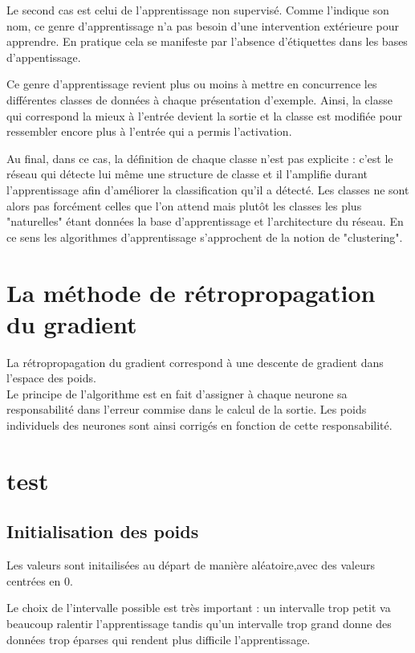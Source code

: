 \documentclass[a4paper,twoside]{report}
\begin{document}
                Le second cas est celui de l'apprentissage non supervisé. Comme l'indique son nom, ce genre d'apprentissage n'a pas besoin d'une intervention extérieure pour apprendre. En pratique cela se manifeste par l'absence d'étiquettes dans les bases d'appentissage.

                Ce genre d'apprentissage revient plus ou moins à mettre en concurrence les différentes classes de données à chaque présentation d'exemple. Ainsi, la classe qui correspond la mieux à l'entrée devient la sortie et la classe est modifiée pour ressembler encore plus à l'entrée qui a permis l'activation.

                Au final, dans ce cas, la définition de chaque classe n'est pas explicite : c'est le réseau qui détecte lui même une structure de classe et il l'amplifie durant l'apprentissage afin d'améliorer la classification qu'il a détecté. Les classes ne sont alors pas forcément celles que l'on attend mais plutôt les classes les plus "naturelles" étant données la base d'apprentissage et l'architecture du réseau. En ce sens les algorithmes d'apprentissage s'approchent de la notion de "clustering".


            \section{La méthode de rétropropagation du gradient}

                La rétropropagation du gradient correspond à une descente de gradient dans l'espace des poids.\\

                Le principe de l'algorithme est en fait d'assigner à chaque neurone sa responsabilité dans l'erreur commise dans le calcul de la sortie. Les poids individuels des neurones sont ainsi corrigés en fonction de cette responsabilité.
                \section{test}


                \subsection{Initialisation des poids}

                    Les valeurs sont initailisées au départ de manière aléatoire,avec des valeurs centrées en 0.

                    Le choix de l'intervalle possible est très important : un intervalle trop petit va beaucoup ralentir l'apprentissage tandis qu'un intervalle trop grand donne des données trop éparses qui rendent plus difficile l'apprentissage.
\end{document}
